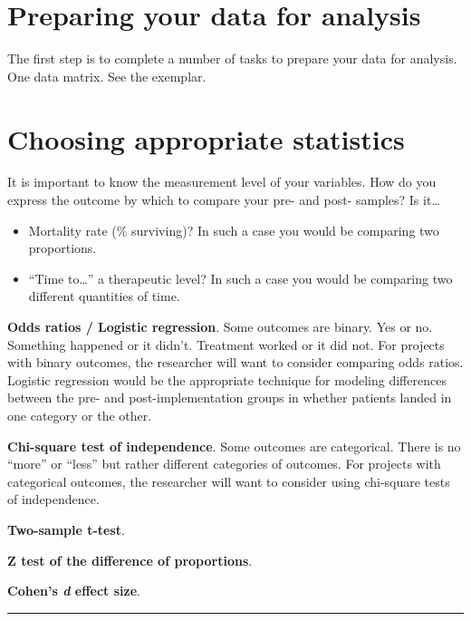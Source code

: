 \documentclass[
]{report}
\providecommand{\tightlist}{%
  \setlength{\itemsep}{0pt}\setlength{\parskip}{0pt}}
\begin{document}
\hypertarget{preparing-your-data-for-analysis}{%
\section{Preparing your data for
analysis}\label{preparing-your-data-for-analysis}}

The first step is to complete a number of tasks to prepare your data for
analysis. One data matrix. See the exemplar.

\hypertarget{choosing-appropriate-statistics}{%
\section{Choosing appropriate
statistics}\label{choosing-appropriate-statistics}}

It is important to know the measurement level of your variables. How do
you express the outcome by which to compare your pre- and post- samples?
Is it\ldots{}

\begin{itemize}
\tightlist
\item
  Mortality rate (\% surviving)? In such a case you would be comparing
  two proportions.
\item
  ``Time to\ldots{}'' a therapeutic level? In such a case you would be
  comparing two different quantities of time.
\end{itemize}

\textbf{Odds ratios / Logistic regression}. Some outcomes are binary.
Yes or no. Something happened or it didn't. Treatment worked or it did
not. For projects with binary outcomes, the researcher will want to
consider comparing odds ratios. Logistic regression would be the
appropriate technique for modeling differences between the pre- and
post-implementation groups in whether patients landed in one category or
the other.

\textbf{Chi-square test of independence}. Some outcomes are categorical.
There is no ``more'' or ``less'' but rather different categories of
outcomes. For projects with categorical outcomes, the researcher will
want to consider using chi-square tests of independence.

\textbf{Two-sample t-test}.

\textbf{Z test of the difference of proportions}.

\textbf{Cohen's \emph{d} effect size}.

\begin{center}\rule{0.5\linewidth}{0.5pt}\end{center}
\end{document}
